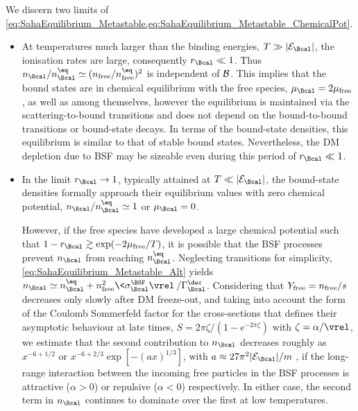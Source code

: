 \documentclass[preprint,5p,twocolumn]{elsarticle}
\begin{document}
We discern two limits of \cref{eq:SahaEquilibrium_Metastable,eq:SahaEquilibrium_Metastable_ChemicalPot}.
%
\begin{itemize}
\item 
At temperatures much larger than the  binding energies, $T \gg |{\cal E}_{\Bcal}|$, the ionisation rates are large, consequently $r_{\Bcal} \ll 1$. Thus $n_{\Bcal}/n_{\Bcal}^\eq \simeq ( n_{\rm free}/n_{\rm free}^{\eq} )^2$ is independent of ${\cal B}$. 
This implies that the bound states are in chemical equilibrium with the free species, $\mu_{\Bcal} = 2\mu_{\rm free}$, as well as among themselves, however the equilibrium is maintained via the scattering-to-bound transitions and does not depend on the bound-to-bound transitions or bound-state decays. 
In terms of the bound-state densities, this equilibrium is similar to that of stable bound states. Nevertheless, the DM depletion due to BSF may be sizeable even during this period of $r_{\Bcal} \ll 1$.

\item
In the limit $r_{\Bcal} \to 1$, typically attained at  $T \ll |{\cal E}_{\Bcal}|$, the bound-state densities formally approach their equilibrium values with zero chemical potential, $n_{\Bcal}/n_{\Bcal}^\eq \simeq 1$ or $\mu_{\Bcal} = 0$. 

However, if the free species have developed a large chemical potential such that 
$1-r_{\Bcal} \gtrsim \exp(-2\mu_{\rm free}/T)$, 
it is possible that the BSF processes prevent $n_{\Bcal}$ from reaching $n_{\Bcal}^{\eq}$.  
Neglecting transitions for simplicity, \cref{eq:SahaEquilibrium_Metastable_Alt} yields 
$n_{\Bcal} \simeq n_{\Bcal}^{\eq} + n_{\rm free}^2 \<\sigma_{\Bcal}^{\BSF} \vrel\> / \Gamma_{\Bcal}^\dec$.
Considering that $Y_{\rm free} = n_{\rm free} / s$ decreases only slowly after DM freeze-out, and taking into account the form of the Coulomb Sommerfeld factor for the cross-sections that defines their asymptotic behaviour at late times, $S = 2\pi\zeta/(1-e^{-2\pi\zeta})$ with $\zeta = \alpha/\vrel$, we estimate that the second contribution to $n_{\Bcal}$ decreases roughly as $x^{-6+1/2}$ or $x^{-6+2/3}\exp[-(a x)^{1/3}]$, with $a \approx 27\pi^2 |{\cal E}_{\Bcal}|/m$ , if the long-range interaction between the incoming free particles in the BSF processes is attractive ($\alpha>0$) or repulsive ($\alpha<0$) respectively. 
In either case, the second term in $n_{\Bcal}$ continues to dominate over the first at low temperatures.

\end{itemize}
\end{document}
